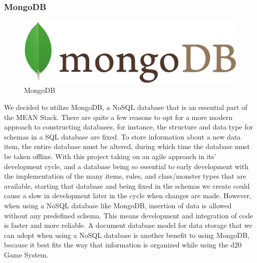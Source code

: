 \documentclass[12pt,a4paper]{report}
\begin{document}
			\subsubsection{MongoDB}
			\begin{figure}
				\includegraphics[scale=0.05]{mongoDB}
				\caption{MongoDB}
				\label{fig: MongoDB}
			\end{figure}
			We decided to utilize MongoDB, a NoSQL database that is an essential part of the MEAN Stack. There are quite a few reasons to opt for a more modern approach to constructing databases, for instance, the structure and data type for schemas in a SQL database are fixed. To store information about a new data item, the entire database must be altered, during which time the database must be taken offline. With this project taking on an agile approach in its’ development cycle, and a database being so essential to early development with the implementation of the many items, rules, and class/monster types that are available, starting that database and being fixed in the schemas we create could cause a slow in development later in the cycle when changes are made. However, when using a NoSQL database like MongoDB, insertion of data is allowed without any predefined schema. This means development and integration of code is faster and more reliable. A document database model for data storage that we can adopt when using a NoSQL database is another benefit to using MongoDB, because it best fits the way that information is organized while using the d20 Game System. \cite{mongodb}
				
\end{document}
